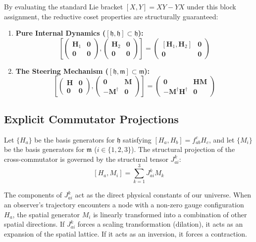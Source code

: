 \documentclass[12pt,letterpaper]{article}
\begin{document}
By evaluating the standard Lie bracket $[X, Y] = XY - YX$ under this block assignment, the reductive coset properties are structurally guaranteed:
\begin{enumerate}
    \item \textbf{Pure Internal Dynamics ($[\mathfrak{h}, \mathfrak{h}] \subset \mathfrak{h}$):}
    $$\left[ \begin{pmatrix} \mathbf{H}_1 & \mathbf{0} \\ \mathbf{0} & \mathbf{0} \end{pmatrix}, \begin{pmatrix} \mathbf{H}_2 & \mathbf{0} \\ \mathbf{0} & \mathbf{0} \end{pmatrix} \right] = \begin{pmatrix} [\mathbf{H}_1, \mathbf{H}_2] & \mathbf{0} \\ \mathbf{0} & \mathbf{0} \end{pmatrix}$$
    \item \textbf{The Steering Mechanism ($[\mathfrak{h}, \mathfrak{m}] \subset \mathfrak{m}$):}
    $$\left[ \begin{pmatrix} \mathbf{H} & \mathbf{0} \\ \mathbf{0} & \mathbf{0} \end{pmatrix}, \begin{pmatrix} \mathbf{0} & \mathbf{M} \\ -\mathbf{M}^\dagger & \mathbf{0} \end{pmatrix} \right] = \begin{pmatrix} \mathbf{0} & \mathbf{H}\mathbf{M} \\ -\mathbf{M}^\dagger\mathbf{H}^\dagger & \mathbf{0} \end{pmatrix}$$
\end{enumerate}

\subsection{Explicit Commutator Projections}
Let $\{H_a\}$ be the basis generators for $\mathfrak{h}$ satisfying $[H_a, H_b] = f_{ab}^c H_c$, and let $\{M_i\}$ be the basis generators for $\mathfrak{m}$ ($i \in \{1, 2, 3\}$). The structural projection of the cross-commutator is governed by the structural tensor $J_{ai}^k$:
$$[H_a, M_i] = \sum_{k=1}^3 J_{ai}^k M_k$$

The components of $J_{ai}^k$ act as the direct physical constants of our universe. When an observer's trajectory encounters a node with a non-zero gauge configuration $H_a$, the spatial generator $M_i$ is linearly transformed into a combination of other spatial directions. If $J_{ai}^k$ forces a scaling transformation (dilation), it acts as an expansion of the spatial lattice. If it acts as an inversion, it forces a contraction.
\end{document}
